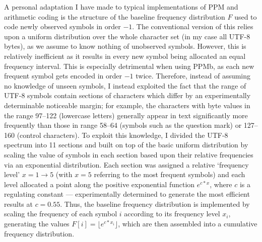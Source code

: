 \documentclass[a4paper, 11pt]{article}
\begin{document}
A personal adaptation I have made to typical implementations of PPM and arithmetic coding is the structure of the baseline frequency distribution $F$ used to code newly observed symbols in order $-1$. The conventional version of this relies upon a uniform distribution over the whole character set (in my case all UTF-8 bytes), as we assume to know nothing of unobserved symbols. However, this is relatively inefficient as it results in every new symbol being allocated an equal frequency interval. This is especially detrimental when using PPMb, as each new frequent symbol gets encoded in order $-1$ twice. Therefore, instead of assuming no knowledge of unseen symbols, I instead exploited the fact that the range of UTF-8 symbols contain sections of characters which differ by an experimentally determinable noticeable margin; for example, the characters with byte values in the range 97--122 (lowercase letters) generally appear in text significantly more frequently than those in range 58--64 (symbols such as the question mark) or 127--160 (control characters). To exploit this knowledge, I divided the UTF-8 spectrum into 11 sections and built on top of the basic uniform distribution by scaling the value of symbols in each section based upon their relative frequencies via an exponential distribution. Each section was assigned a relative ‘frequency level’ $x = 1 \to 5$ (with $x=5$ referring to the most frequent symbols) and each level allocated a point along the positive exponential function $e^{c * x}$, where $c$ is a regulating constant --- experimentally determined to generate the most efficient results at $c = 0.55$. Thus, the baseline frequency distribution is implemented by scaling the frequency of each symbol $i$ according to its frequency level $x_{i}$, generating the values $F[i] = \lfloor e^{c * x_{i}} \rfloor$, which are then assembled into a cumulative frequency distribution.
\end{document}
